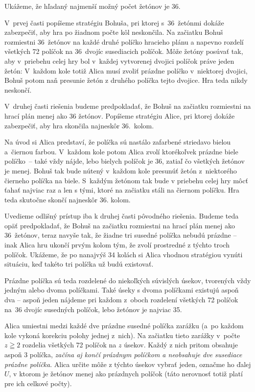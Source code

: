 {%
Ukážeme, že hľadaný najmenší možný počet žetónov je 36.

V~prvej časti popíšeme stratégiu Bohuša, pri ktorej
s~36~žetónmi dokáže zabezpečiť, aby hra po žiadnom počte kôl
neskončila. Na začiatku Bohuš rozmiestni 36~žetónov
na každé druhé políčko hracieho plánu a napevno rozdelí
všetkých 72 políčok na 36~dvojíc susediacich políčok. Môže žetóny
posúvať tak, aby v~priebehu celej hry bol v~každej vytvorenej dvojici
políčok práve jeden žetón: V~každom kole totiž Alica
musí zvoliť prázdne políčko v~niektorej dvojici, Bohuš
potom naň presunie žetón z druhého políčka tejto dvojice.
Hra teda nikdy neskončí.

V~druhej časti riešenia budeme predpokladať, že
Bohuš na začiatku rozmiestni na hrací plán menej ako 36 žetónov.
Popíšeme stratégiu Alice, pri ktorej dokáže zabezpečiť, aby hra
skončila najneskôr 36.~kolom.

Na úvod si Alica predstaví, že políčka sú nastálo zafarbené striedavo
bielou a~čiernou farbou. V~každom kole potom Alica zvolí ktorékoľvek
prázdne biele políčko~-- také vždy nájde, lebo bielych políčok je
36, zatiaľ čo všetkých žetónov je menej. Bohuš tak bude nútený v~každom kole
presunúť žetón z~niektorého čierneho políčka na biele. S~každým
žetónom tak bude v priebehu celej hry môcť ťahať najviac raz a len s tými, ktoré na začiatku stáli na čiernom políčku.
Hra teda skutočne skončí najneskôr 36. kolom.

\ineriesenie
Uvedieme odlišný prístup iba k druhej časti pôvodného riešenia.
Budeme teda opäť predpokladať, že Bohuš na začiatku rozmiestni na hrací
plán menej ako 36~žetónov, teraz navyše tak, že žiadne tri susedné políčka
nebudú prázdne -- inak Alica hru ukončí prvým kolom tým, že
zvolí prostredné z týchto troch políčok. Ukážeme, že po nanajvýš
34 kolách si Alica vhodnou stratégiou vynúti situáciu,
keď takéto tri políčka už budú existovať.

Prázdne políčka sú teda rozdelené do
niekoľkých súvislých úsekov, tvorených vždy jedným alebo dvoma políčkami.
Také úseky s dvoma políčkami existujú aspoň dva -- aspoň jeden nájdeme pri
každom z~oboch rozdelení všetkých 72 políčok na~36 dvojíc susedných políčok,
lebo žetónov je najviac 35.

Alica umiestni medzi každé dve prázdne susedné políčka zarážku (a~po
každom kole vykoná korekciu polohy jednej z~nich). Na začiatku
tieto zarážky v~počte $z\geqq2$ rozdelia všetkých 72 políčok na $z$
úsekov. Každý z nich pritom obsahuje aspoň 3 políčka,
{\it začína aj končí prázdnym políčkom a neobsahuje dve susediace
prázdne políčka}. Alica určite môže z týchto úsekov vybrať
jeden, označme ho ďalej $U$, v ktorom je žetónov menej ako prázdnych
políčok (táto nerovnosť totiž platí pre ich celkové počty).

}
